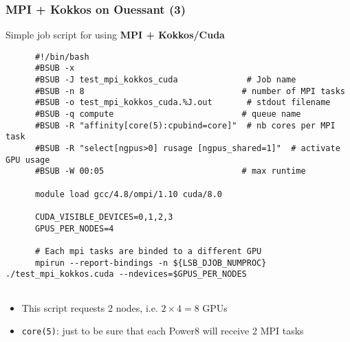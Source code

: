 \begin{frame}[fragile=singleslide]
  \frametitle{MPI + Kokkos on Ouessant (3)}

  {\Large Simple job script for using \textbf{MPI + Kokkos/Cuda}}

  {\scriptsize
    \begin{verbatim}
      #!/bin/bash
      #BSUB -x
      #BSUB -J test_mpi_kokkos_cuda              # Job name
      #BSUB -n 8                                # number of MPI tasks
      #BSUB -o test_mpi_kokkos_cuda.%J.out       # stdout filename
      #BSUB -q compute                          # queue name
      #BSUB -R "affinity[core(5):cpubind=core]"  # nb cores per MPI task
      #BSUB -R "select[ngpus>0] rusage [ngpus_shared=1]"  # activate GPU usage
      #BSUB -W 00:05                            # max runtime
            
      module load gcc/4.8/ompi/1.10 cuda/8.0
      
      CUDA_VISIBLE_DEVICES=0,1,2,3      
      GPUS_PER_NODES=4
      
      # Each mpi tasks are binded to a different GPU
      mpirun --report-bindings -n ${LSB_DJOB_NUMPROC} ./test_mpi_kokkos.cuda --ndevices=$GPUS_PER_NODES
      
    \end{verbatim}
  }
  \begin{itemize}
    \item This script requests 2 nodes, i.e. $2\times4=8$ GPUs
  \item \texttt{core(5)}: just to be sure that each Power8 will receive 2 MPI tasks
  \end{itemize}
\end{frame}

